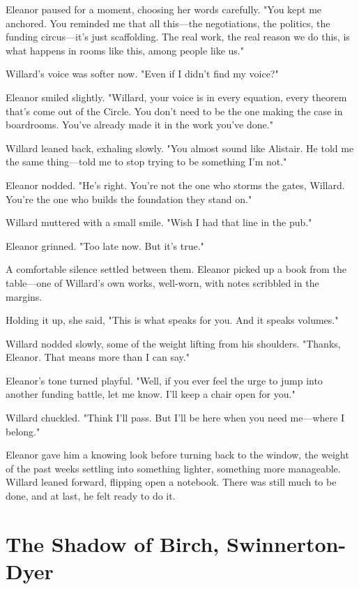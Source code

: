 Eleanor paused for a moment, choosing her words carefully.  
"You kept me anchored. You reminded me that all this—the negotiations, the politics, the funding circus—it’s just scaffolding. The real work, the real reason we do this, is what happens in rooms like this, among people like us."
\smallskip

Willard’s voice was softer now.  
"Even if I didn’t find my voice?"
\smallskip

Eleanor smiled slightly.  
"Willard, your voice is in every equation, every theorem that’s come out of the Circle. You don’t need to be the one making the case in boardrooms. You’ve already made it in the work you’ve done."
\smallskip

Willard leaned back, exhaling slowly.  
"You almost sound like Alistair. He told me the same thing—told me to stop trying to be something I’m not."
\smallskip

Eleanor nodded.  
"He’s right. You’re not the one who storms the gates, Willard. You’re the one who builds the foundation they stand on."
\smallskip

Willard muttered with a small smile.  
"Wish I had that line in the pub."
\smallskip

Eleanor grinned.  
"Too late now. But it’s true."
\smallskip

A comfortable silence settled between them. Eleanor picked up a book from the table—one of Willard’s own works, well-worn, with notes scribbled in the margins.

Holding it up, she said,  
"This is what speaks for you. And it speaks volumes."

Willard nodded slowly, some of the weight lifting from his shoulders.  
"Thanks, Eleanor. That means more than I can say."

Eleanor’s tone turned playful.  
"Well, if you ever feel the urge to jump into another funding battle, let me know. I’ll keep a chair open for you."

Willard chuckled.  
"Think I’ll pass. But I’ll be here when you need me—where I belong."
\smallskip

Eleanor gave him a knowing look before turning back to the window, the weight of the past weeks settling into something lighter, something more manageable. Willard leaned forward, flipping open a notebook. There was still much to be done, and at last, he felt ready to do it.

\section*{The Shadow of Birch, Swinnerton-Dyer}

